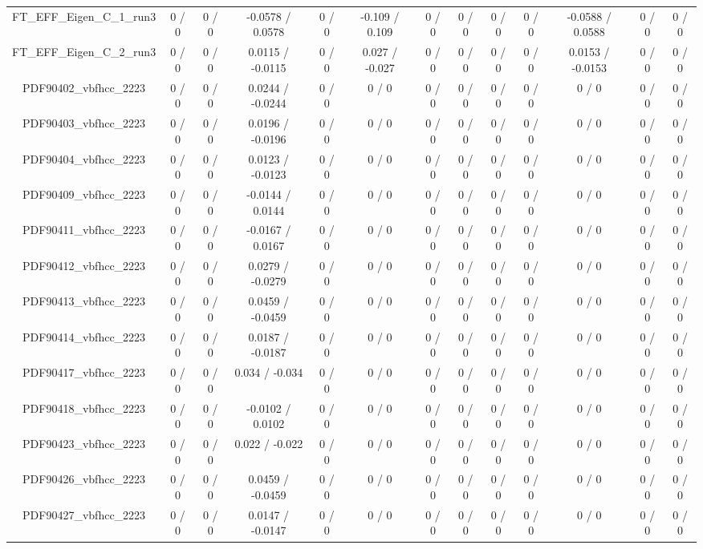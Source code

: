 \documentclass[10pt]{article}
\begin{document}
\begin{table}[htbp]
\begin{center}
\begin{tabular}{|c|c|c|c|c|c|c|c|c|c|c|c|c|}
  FT_EFF_Eigen_C_1_run3 & 0 / 0 & 0 / 0 & -0.0578 / 0.0578 & 0 / 0 & -0.109 / 0.109 & 0 / 0 & 0 / 0 & 0 / 0 & 0 / 0 & -0.0588 / 0.0588 & 0 / 0 & 0 / 0 \\ 
  FT_EFF_Eigen_C_2_run3 & 0 / 0 & 0 / 0 & 0.0115 / -0.0115 & 0 / 0 & 0.027 / -0.027 & 0 / 0 & 0 / 0 & 0 / 0 & 0 / 0 & 0.0153 / -0.0153 & 0 / 0 & 0 / 0 \\ 
  PDF90402_vbfhcc_2223 & 0 / 0 & 0 / 0 & 0.0244 / -0.0244 & 0 / 0 & 0 / 0 & 0 / 0 & 0 / 0 & 0 / 0 & 0 / 0 & 0 / 0 & 0 / 0 & 0 / 0 \\ 
  PDF90403_vbfhcc_2223 & 0 / 0 & 0 / 0 & 0.0196 / -0.0196 & 0 / 0 & 0 / 0 & 0 / 0 & 0 / 0 & 0 / 0 & 0 / 0 & 0 / 0 & 0 / 0 & 0 / 0 \\ 
  PDF90404_vbfhcc_2223 & 0 / 0 & 0 / 0 & 0.0123 / -0.0123 & 0 / 0 & 0 / 0 & 0 / 0 & 0 / 0 & 0 / 0 & 0 / 0 & 0 / 0 & 0 / 0 & 0 / 0 \\ 
  PDF90409_vbfhcc_2223 & 0 / 0 & 0 / 0 & -0.0144 / 0.0144 & 0 / 0 & 0 / 0 & 0 / 0 & 0 / 0 & 0 / 0 & 0 / 0 & 0 / 0 & 0 / 0 & 0 / 0 \\ 
  PDF90411_vbfhcc_2223 & 0 / 0 & 0 / 0 & -0.0167 / 0.0167 & 0 / 0 & 0 / 0 & 0 / 0 & 0 / 0 & 0 / 0 & 0 / 0 & 0 / 0 & 0 / 0 & 0 / 0 \\ 
  PDF90412_vbfhcc_2223 & 0 / 0 & 0 / 0 & 0.0279 / -0.0279 & 0 / 0 & 0 / 0 & 0 / 0 & 0 / 0 & 0 / 0 & 0 / 0 & 0 / 0 & 0 / 0 & 0 / 0 \\ 
  PDF90413_vbfhcc_2223 & 0 / 0 & 0 / 0 & 0.0459 / -0.0459 & 0 / 0 & 0 / 0 & 0 / 0 & 0 / 0 & 0 / 0 & 0 / 0 & 0 / 0 & 0 / 0 & 0 / 0 \\ 
  PDF90414_vbfhcc_2223 & 0 / 0 & 0 / 0 & 0.0187 / -0.0187 & 0 / 0 & 0 / 0 & 0 / 0 & 0 / 0 & 0 / 0 & 0 / 0 & 0 / 0 & 0 / 0 & 0 / 0 \\ 
  PDF90417_vbfhcc_2223 & 0 / 0 & 0 / 0 & 0.034 / -0.034 & 0 / 0 & 0 / 0 & 0 / 0 & 0 / 0 & 0 / 0 & 0 / 0 & 0 / 0 & 0 / 0 & 0 / 0 \\ 
  PDF90418_vbfhcc_2223 & 0 / 0 & 0 / 0 & -0.0102 / 0.0102 & 0 / 0 & 0 / 0 & 0 / 0 & 0 / 0 & 0 / 0 & 0 / 0 & 0 / 0 & 0 / 0 & 0 / 0 \\ 
  PDF90423_vbfhcc_2223 & 0 / 0 & 0 / 0 & 0.022 / -0.022 & 0 / 0 & 0 / 0 & 0 / 0 & 0 / 0 & 0 / 0 & 0 / 0 & 0 / 0 & 0 / 0 & 0 / 0 \\ 
  PDF90426_vbfhcc_2223 & 0 / 0 & 0 / 0 & 0.0459 / -0.0459 & 0 / 0 & 0 / 0 & 0 / 0 & 0 / 0 & 0 / 0 & 0 / 0 & 0 / 0 & 0 / 0 & 0 / 0 \\ 
  PDF90427_vbfhcc_2223 & 0 / 0 & 0 / 0 & 0.0147 / -0.0147 & 0 / 0 & 0 / 0 & 0 / 0 & 0 / 0 & 0 / 0 & 0 / 0 & 0 / 0 & 0 / 0 & 0 / 0 \\ 

\end{tabular}
\end{center}
\end{table}
\end{document}
